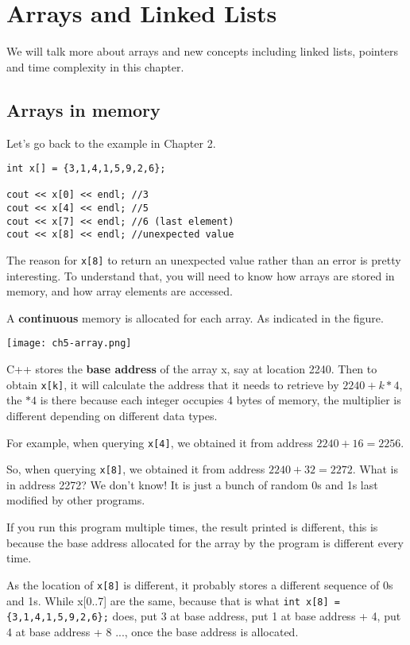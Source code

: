 \chapter{Arrays and Linked Lists}

We will talk more about arrays and new concepts including linked lists, pointers and time complexity in this chapter.

\section{Arrays in memory}

Let's go back to the example in Chapter 2.

\begin{lstlisting}
int x[] = {3,1,4,1,5,9,2,6};

cout << x[0] << endl; //3 
cout << x[4] << endl; //5
cout << x[7] << endl; //6 (last element)
cout << x[8] << endl; //unexpected value 
\end{lstlisting}

The reason for \texttt{x[8]} to return an unexpected value rather than an error is pretty interesting. To understand that, you will need to know how arrays are stored in memory, and how array elements are accessed. 

A \textbf{continuous} memory is allocated for each array. As indicated in the figure.

\texttt{[image: ch5-array.png]}

C++ stores the \textbf{base address} of the array x, say at location 2240. Then to obtain \texttt{x[k]}, it will calculate the address that it needs to retrieve by $2240 + k*4$, the $*4$ is there because each integer occupies 4 bytes of memory, the multiplier is different depending on different data types. 

For example, when querying \texttt{x[4]}, we obtained it from address $2240+16 = 2256$. 

So, when querying \texttt{x[8]}, we obtained it from address $2240+32 = 2272$. What is in address 2272? We don't know! It is just a bunch of random 0s and 1s last modified by other programs. 
\vspace{6mm}

If you run this program multiple times, the result printed is different, this is because the base address allocated for the array by the program is different every time. 

As the location of \texttt{x[8]} is different, it probably stores a different sequence of 0s and 1s. While x[0..7] are the same, because that is what \texttt{int x[8] = \{3,1,4,1,5,9,2,6\};} does, put 3 at base address, put 1 at base address + 4, put 4 at base address + 8 ..., once the base address is allocated.

